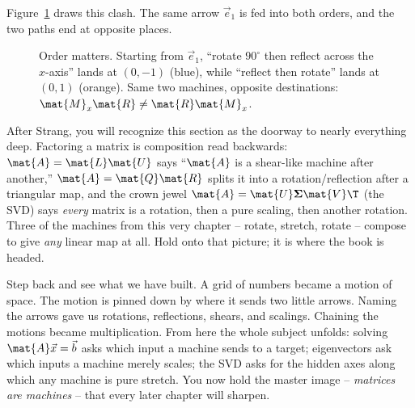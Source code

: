 Figure~\ref{ch05:fig-order} draws this clash. The same arrow $\vec{e}_1$ is fed
into both orders, and the two paths end at opposite places.

\begin{figure}[H]
\centering
{}
\caption{Order matters. Starting from $\vec{e}_1$, ``rotate $90^\circ$ then
reflect across the $x$-axis'' lands at $(0,-1)$ (blue), while ``reflect then
rotate'' lands at $(0,1)$ (orange). Same two machines, opposite destinations:
$\mat{M}_x\mat{R}\neq\mat{R}\mat{M}_x$.}
\label{ch05:fig-order}
\end{figure}

\begin{strangbox}
After Strang, you will recognize this section as the doorway to nearly everything
deep. Factoring a matrix is composition read backwards: $\mat{A} = \mat{L}\mat{U}$
says ``$\mat{A}$ is a shear-like machine after another,'' $\mat{A} = \mat{Q}\mat{R}$
splits it into a rotation/reflection after a triangular map, and the crown jewel
$\mat{A} = \mat{U}\mathbf{\Sigma}\mat{V}\T$ (the SVD) says \emph{every} matrix is
a rotation, then a pure scaling, then another rotation. Three of the machines from
this very chapter -- rotate, stretch, rotate -- compose to give \emph{any} linear
map at all. Hold onto that picture; it is where the book is headed.
\end{strangbox}

\begin{aestheticbox}
Step back and see what we have built. A grid of numbers became a motion of space.
The motion is pinned down by where it sends two little arrows. Naming the arrows
gave us rotations, reflections, shears, and scalings. Chaining the motions became
multiplication. From here the whole subject unfolds: solving $\mat{A}\vec{x} =
\vec{b}$ asks which input a machine sends to a target; eigenvectors ask which
inputs a machine merely scales; the SVD asks for the hidden axes along which any
machine is pure stretch. You now hold the master image -- \emph{matrices are
machines} -- that every later chapter will sharpen.
\end{aestheticbox}

